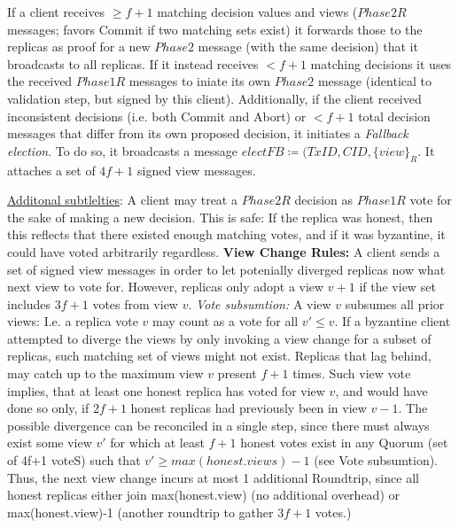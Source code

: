 
If a client receives $\geq f+1$ matching decision values and views ($Phase2R$ messages; favors Commit if two matching sets exist) it forwards those to the replicas as proof for a new $Phase2$ message (with the same decision) that it broadcasts to all replicas. If it instead receives $< f+1$ matching decisions it uses the received $Phase1R$ messages to iniate its own $Phase2$ message (identical to validation step, but signed by this client). 
Additionally, if the client received inconsistent decisions (i.e. both Commit and Abort) or $<f+1$ total decision messages that differ from its own proposed decision, it initiates a \textit{Fallback election}. To do so, it broadcasts a message $electFB \coloneqq (TxID, CID, \{view\}_R$. It attaches a set of $4f+1$ signed view messages.  

\underline{Additonal subtlelties}: A client may treat a $Phase2R$ decision as $Phase1R$ vote for the sake of making a new decision. This is safe: If the replica was honest, then this reflects that there existed enough matching votes, and if it was byzantine, it could have voted arbitrarily regardless. 
 \textbf{View Change Rules:} A client sends a set of signed view messages in order to let potenially diverged replicas now what next view to vote for. However, replicas only adopt a view $v+1$ if the view set includes $3f+1$  votes from view $v$. \textit{Vote subsumtion:} A view $v$ subsumes all prior views: I.e. a replica vote $v$ may count as a vote for all $v' \leq v$. If a byzantine client attempted to diverge the views by only invoking a view change for a subset of replicas, such matching set of views might not exist. 
Replicas that lag behind, may catch up to the maximum view $v$ present $f+1$ times. Such view vote implies, that at least one honest replica has voted for view $v$, and would have done so only, if $2f+1$ honest replicas had previously been in view $v-1$. The possible divergence can be reconciled in a single step, since there must always exist some view $v'$ for which at least $f+1$ honest votes exist in any Quorum (set of 4f+1 voteS) such that $v' \geq max(honest.views) -1 $ (see Vote subsumtion). Thus, the next view change incurs at most 1 additional Roundtrip, since all honest replicas either join max(honest.view) (no additional overhead) or max(honest.view)-1 (another roundtrip to gather $3f+1$ votes.)




